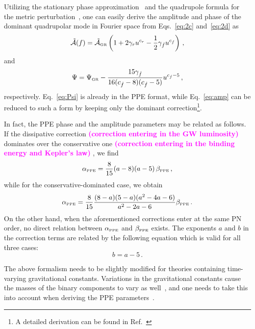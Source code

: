 \documentclass[prd,twocolumn,nofootinbib]{revtex4-1}
\newcommand\be{\begin{equation}}
\newcommand\ee{\end{equation}}
\newcommand{\PPE}{{\mbox{\tiny PPE}}}
\newcommand{\GR}{{\mbox{\tiny GR}}}
\newcommand{\kent}[1]{\textcolor{magenta}{\textbf{#1}} }
\begin{document}
Utilizing the stationary phase approximation~\cite{PhysRevD.62.084036,Yunes:2009yz} and the quadrupole formula for the metric perturbation~\cite{Blanchet:2002av}, one can easily derive the amplitude and phase of the dominant quadrupolar mode in Fourier space from Eqs.~\eqref{eq:2c} and~\eqref{eq:2d} as
\begin{equation}\label{eq:amp}
\tilde{\mathcal{A}}(f)=\tilde{\mathcal{A}}_{\GR} \left(1+2\gamma_ru^{c_r}-\frac{1}{2}\gamma_{\dot{f}}u^{c_{\dot{f}}}\right)\,,
\end{equation}
and
\be
\label{eq:Psi}
\Psi = \Psi_\GR  -\frac{15 \text{$\gamma_{\dot{f}} $}}{16 (\text{$c_{\dot{f}}$}-8) (\text{$c_{\dot{f}}$}-5)} u^{c_{\dot{f}}-5}\,,
\ee
respectively. Eq.~\eqref{eq:Psi} is already in the PPE format, while  Eq.~\eqref{eq:amp} can be reduced to such a form by keeping only the dominant correction\footnote{A detailed derivation can be found in Ref.~\cite{Tahura:2018zuq}}.

In fact, the PPE phase and the amplitude parameters may be related as follows. If the dissipative correction \kent{(correction entering in the GW luminosity)} dominates over the conservative one \kent{(correction entering in the binding energy and Kepler's law)}, we find
\begin{equation}\label{eq:2w2}
\alpha_{\PPE} = \frac{8}{15} (a-8)(a-5) \, \beta_{\PPE}\,,
\end{equation}
while for the conservative-dominated case, we obtain
\begin{equation}\label{eq:2w3}
\alpha_{\PPE} =\frac{8}{15} \frac{(8-a)(5-a)(a^2-4a-6)}{a^2-2a-6} \beta_{\PPE}\,.
\end{equation}
On the other hand, when the aforementioned corrections enter at the same PN order, no direct relation between $\alpha_{\PPE}$ and $\beta_{\PPE}$ exists. The exponents $a$ and $b$ in the correction terms are related by the following equation which is valid for all three cases:
\begin{equation}
b=a-5\,.
\end{equation}


The above formalism needs to be slightly modified for theories containing time-varying gravitational constants. Variations in the gravitational constants cause the masses  of the binary components to vary as well~\cite{PhysRevLett.65.953}, and one needs to take this into account when deriving the PPE parameters~\cite{Tahura:2018zuq}.
\end{document}
